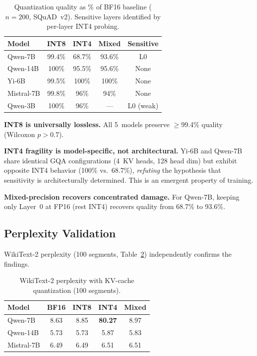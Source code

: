 \documentclass{article}
\begin{document}
\begin{table}[t]
\centering
\caption{Quantization quality as \% of BF16 baseline ($n = 200$, SQuAD~v2). Sensitive layers identified by per-layer INT4 probing.}
\label{tab:quantization}
\small
\begin{tabular}{@{}lcccc@{}}
\toprule
\textbf{Model} & \textbf{INT8} & \textbf{INT4} & \textbf{Mixed} & \textbf{Sensitive} \\
\midrule
Qwen-7B    & 99.4\% & 68.7\% & 93.6\% & L0 \\
Qwen-14B   & 100\%  & 95.5\% & 95.6\% & None \\
Yi-6B      & 99.5\% & 100\%  & 100\%  & None \\
Mistral-7B & 99.8\% & 96\%   & 94\%   & None \\
Qwen-3B    & 100\%  & 96\%   & ---    & L0 (weak) \\
\bottomrule
\end{tabular}
\end{table}

\textbf{INT8 is universally lossless.}
All 5~models preserve $\geq$99.4\% quality (Wilcoxon $p > 0.7$).

\textbf{INT4 fragility is model-specific, not architectural.}
Yi-6B and Qwen-7B share identical GQA configurations (4~KV heads, 128 head dim) but exhibit opposite INT4 behavior (100\% vs.\ 68.7\%), \emph{refuting} the hypothesis that sensitivity is architecturally determined.
This is an emergent property of training.

\textbf{Mixed-precision recovers concentrated damage.}
For Qwen-7B, keeping only Layer~0 at FP16 (rest INT4) recovers quality from 68.7\% to 93.6\%.

\subsection{Perplexity Validation}

WikiText-2 perplexity (100 segments, Table~\ref{tab:perplexity}) independently confirms the findings.

\begin{table}[t]
\centering
\caption{WikiText-2 perplexity with KV-cache quantization (100 segments).}
\label{tab:perplexity}
\small
\begin{tabular}{@{}lcccc@{}}
\toprule
\textbf{Model} & \textbf{BF16} & \textbf{INT8} & \textbf{INT4} & \textbf{Mixed} \\
\midrule
Qwen-7B    & 8.63  & 8.85  & \textbf{80.27} & 8.97  \\
Qwen-14B   & 5.73  & 5.73  & 5.87  & 5.83  \\
Mistral-7B & 6.49  & 6.49  & 6.51  & 6.51  \\
\bottomrule
\end{tabular}
\end{table}
\end{document}
